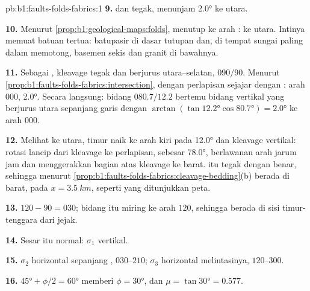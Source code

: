 \begin{solution}{pb:b1:faults-folds-fabrics:1}
\textbf{9.}  dan tegak, menunjam \ang{2.0} ke utara.

\textbf{10.} Menurut \cref{prop:b1:geological-maps:folds},   menutup ke arah
: ke utara. Intinya memuat batuan tertua: batupasir di dasar tutupan dan, di tempat sungai
paling dalam memotong, basemen sekis dan granit di bawahnya.

\textbf{11.} Sebagai , kleavage tegak dan berjurus utara--selatan, $090/90$. Menurut
\cref{prop:b1:faults-folds-fabrics:intersection},  dengan perlapisan sejajar
dengan : arah $000$,  \ang{2.0}. Secara langsung: bidang $080.7/12.2$ bertemu
bidang vertikal yang berjurus utara sepanjang garis dengan  $\arctan(\tan\ang{12.2}
\cos\ang{80.7}) = \ang{2.0}$ ke arah $000$.

\textbf{12.} Melihat ke utara,  timur naik ke arah kiri pada \ang{12.0} dan kleavage vertikal:
rotasi lancip dari kleavage ke perlapisan, sebesar \ang{78.0}, berlawanan arah jarum jam dan
menggerakkan bagian atas kleavage ke barat.  itu tegak dengan benar, sehingga menurut
\cref{prop:b1:faults-folds-fabrics:cleavage-bedding}(b)   berada di barat, pada
$x = \qty{3.5}{km}$, seperti yang ditunjukkan peta.

\textbf{13.}  $120 - 90 = 030$; bidang itu miring ke arah $120$, sehingga 
berada di sisi timur-tenggara dari jejak.

\textbf{14.} Sesar itu normal: $\sigma_1$ vertikal.

\textbf{15.} $\sigma_2$ horizontal sepanjang , $030$--$210$;
$\sigma_3$ horizontal melintasinya,
$120$--$300$.

\textbf{16.} $\ang{45} + \phi/2 = \ang{60}$ memberi $\phi = \ang{30}$, dan
$\mu = \tan\ang{30} = 0.577$.


\end{solution}
